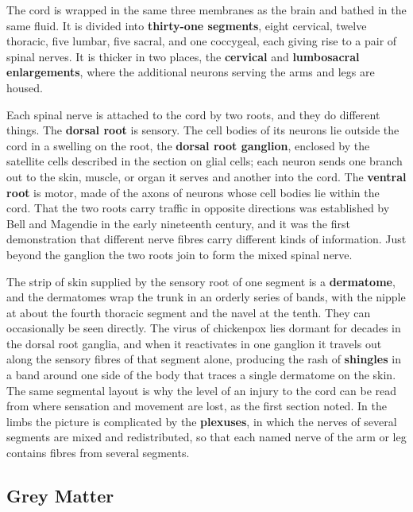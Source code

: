 \documentclass[11pt]{article}
\begin{document}
The cord is wrapped in the same three membranes as the brain and bathed in the same fluid. It is divided into \textbf{thirty-one segments}, eight cervical, twelve thoracic, five lumbar, five sacral, and one coccygeal, each giving rise to a pair of spinal nerves. It is thicker in two places, the \textbf{cervical} and \textbf{lumbosacral enlargements}, where the additional neurons serving the arms and legs are housed.

Each spinal nerve is attached to the cord by two roots, and they do different things. The \textbf{dorsal root} is sensory. The cell bodies of its neurons lie outside the cord in a swelling on the root, the \textbf{dorsal root ganglion}, enclosed by the satellite cells described in the section on glial cells; each neuron sends one branch out to the skin, muscle, or organ it serves and another into the cord. The \textbf{ventral root} is motor, made of the axons of neurons whose cell bodies lie within the cord. That the two roots carry traffic in opposite directions was established by Bell and Magendie in the early nineteenth century, and it was the first demonstration that different nerve fibres carry different kinds of information. Just beyond the ganglion the two roots join to form the mixed spinal nerve.

The strip of skin supplied by the sensory root of one segment is a \textbf{dermatome}, and the dermatomes wrap the trunk in an orderly series of bands, with the nipple at about the fourth thoracic segment and the navel at the tenth. They can occasionally be seen directly. The virus of chickenpox lies dormant for decades in the dorsal root ganglia, and when it reactivates in one ganglion it travels out along the sensory fibres of that segment alone, producing the rash of \textbf{shingles} in a band around one side of the body that traces a single dermatome on the skin. The same segmental layout is why the level of an injury to the cord can be read from where sensation and movement are lost, as the first section noted. In the limbs the picture is complicated by the \textbf{plexuses}, in which the nerves of several segments are mixed and redistributed, so that each named nerve of the arm or leg contains fibres from several segments.

\subsection{Grey Matter}
\end{document}
